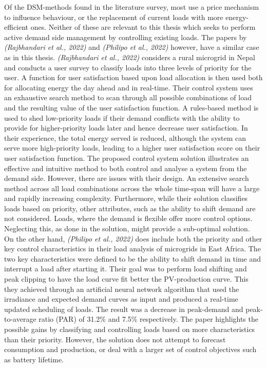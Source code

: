 Of the DSM-methods found in the literature survey, most use  a price mechanism to influence behaviour, or the replacement of current loads with more energy-efficient ones. Neither of these are relevant to this thesis which seeks to perform active demand side management by controlling existing loads. The papers by \textit{(Rajbhandari et al., 2022)} and \textit{(Philipo et al., 2022)} however, have a similar case as in this thesis. \textit{(Rajbhandari et al., 2022)} considers a rural microgrid in Nepal and conducts a user survey to classify loads into three levels of priority for the user. A function for user satisfaction based upon load allocation is then used both for allocating energy the day ahead and in real-time. Their control system uses an exhaustive search method to scan through all possible combinations of load and the resulting value of the user satisfaction function. A rules-based method is used to shed low-priority loads if their demand conflicts with the ability to provide for higher-priority loads later and hence decrease user satisfaction. In their experience, the total energy served is reduced, although the system can serve more high-priority loads, leading to a higher user satisfaction score on their user satisfaction function.  The proposed control system solution illustrates an effective and intuitive method to both  control and analyse a system from the demand side. However, there are issues with their design. An extensive search method across all load combinations across the whole time-span will have a large and rapidly increasing complexity. Furthermore, while their solution classifies loads based on priority, other attributes, such as the ability to shift demand are not considered. Loads, where the demand is flexible offer more control options. Neglecting this, as done in the solution, might provide a sub-optimal solution.\cite{Rajbhandari2022-oo}\\

On the other hand, \textit{(Philipo et al., 2022)}  does include both the priority and other key control characteristics in their load analysis of microgrids in East Africa. The two key characteristics were defined to be the ability to shift demand in time and interrupt a load after starting it. Their goal was to perform load shifting and peak clipping to have the load curve fit better the PV-production curve. This they achieved through an artificial neural network algorithm that used the irradiance and expected demand curves as input and produced a real-time updated scheduling of loads. The result was a decrease in peak-demand and peak-to-average ratio (PAR) of 31.2\% and 7.5\% respectively. The paper highlights the possible gains by classifying and controlling loads based on more characteristics than their priority. However, the solution does not attempt to forecast consumption and production, or deal with a larger set of control objectives such as battery lifetime.\cite{Philipo2022-rx}\\


